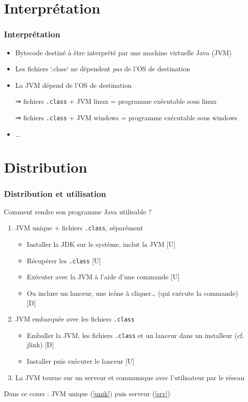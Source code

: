 \documentclass[english, french]{beamer}
\begin{document}
\section{Interprétation}
\begin{frame}
	\frametitle{Interprétation}
	\begin{itemize}
		\item Bytecode destiné à être interprété par une machine virtuelle Java (JVM)
		\item Les fichiers `.class` ne dépendent \emph{pas} de l’OS de destination
		\item La JVM dépend de l’OS de destination
		\item[⇒] fichiers \texttt{.class} + JVM linux = programme exécutable sous linux
		\item[⇒] fichiers \texttt{.class} + JVM windows = programme exécutable sous windows
		\item …
	\end{itemize}
\end{frame}

\section{Distribution}
\begin{frame}
	\frametitle{Distribution et utilisation}
	Comment rendre son programme Java utilisable ?
	\begin{enumerate}
		\item \label{unik} JVM unique + fichiers \texttt{.class}, séparément
		\begin{itemize}
			\item Installer la JDK sur le système, inclut la JVM [U]
			\item Récupérer les \texttt{.class} [U]
			\item Exécuter avec la JVM à l’aide d’une commande [U]
			\item Ou inclure un lanceur, une icône à cliquer… (qui exécute la commande) [D]
		\end{itemize}
		\item JVM embarquée avec les fichiers \texttt{.class}
		\begin{itemize}
			\item Emballer la JVM, les fichiers \texttt{.class} et un lanceur dans un installeur (cf. jlink) [D]
			\item Installer puis exécuter le lanceur [U]
		\end{itemize}
		\item \label{srv} La JVM tourne sur un serveur et communique avec l’utilisateur par le réseau
	\end{enumerate}
	Dans ce cours : JVM unique (\cref{unik}) puis serveur (\cref{srv})
\end{frame}
\end{document}
